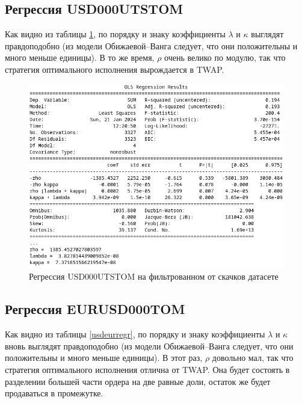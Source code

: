 \subsection{Регрессия USD000UTSTOM}

Как видно из таблицы \ref{usdrubregr}, по порядку и знаку коэффициенты $\lambda$ и $\kappa$ выглядят правдоподобно
(из модели Обижаевой--Ванга следует, что они положительны и много меньше единицы).
В то же время, $\rho$ очень велико по модулю, так что стратегия оптимального исполнения
вырождается в TWAP. 
\begin{figure}
    \includegraphics[scale=0.8]{fig/USDRUBregr.png}
    \caption{Регрессия USD000UTSTOM на фильтрованном от скачков датасете}
    \label{usdrubregr}
\end{figure}

\subsection{Регрессия EURUSD000TOM}

Как видно из таблицы \ref{usdeurregr}, по порядку и знаку коэффициенты $\lambda$ и $\kappa$ вновь 
выглядят правдоподобно
(из модели Обижаевой--Ванга следует, что они положительны и много меньше единицы).
В этот раз, $\rho$ довольно мал, так что стратегия оптимального исполнения
отлична от TWAP. Она будет состоять в разделении большей части ордера на две равные доли,
остаток же будет продаваться в промежутке. 

